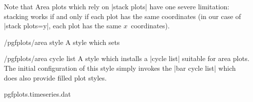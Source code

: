 {Note that Area plots which rely on |stack plots| have one severe limitation: stacking works if and only if each plot has the same coordinates (in our case of |stack plots=y|, each plot has the same $x$~coordinates).

\begin{stylekey}{/pgfplots/area style}
	A style which sets
\begin{codeexample}
\end{codeexample}
\end{stylekey}

\begin{stylekey}{/pgfplots/area cycle list}
	A style which installs a |cycle list| suitable for area plots. The initial configuration of this style simply invokes the |bar cycle list| which does also provide filled plot styles.
\end{stylekey}

\begin{codeexample}[]
\end{codeexample}

\begin{codeexample}[]
\end{codeexample}

\begin{codeexample}[]
\loadedtable
\pgfplotstabletypeset\loadedtable
\end{codeexample}
\begin{codeexample}[]
\pgfplotstableread
	{pgfplots.timeseries.dat}
	{\loadedtable}


\end{codeexample}}

